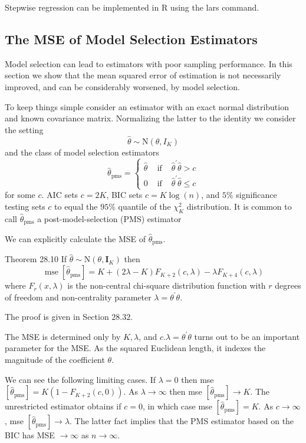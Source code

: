 \documentclass[10pt]{article}
\begin{document}
Stepwise regression can be implemented in R using the lars command.

\subsection{The MSE of Model Selection Estimators}
Model selection can lead to estimators with poor sampling performance. In this section we show that the mean squared error of estimation is not necessarily improved, and can be considerably worsened, by model selection.

To keep things simple consider an estimator with an exact normal distribution and known covariance matrix. Normalizing the latter to the identity we consider the setting
$$
\widehat{\theta} \sim \mathrm{N}\left(\theta, I_{K}\right)
$$
and the class of model selection estimators
$$
\widehat{\theta}_{\mathrm{pms}}=\left\{\begin{array}{lll}
\widehat{\theta} & \text { if } & \widehat{\theta}^{\prime} \widehat{\theta}>c \\
0 & \text { if } & \widehat{\theta}^{\prime} \hat{\theta} \leq c
\end{array}\right.
$$
for some $c$. AIC sets $c=2 K$, BIC sets $c=K \log (n)$, and $5 \%$ significance testing sets $c$ to equal the $95 \%$ quantile of the $\chi_{K}^{2}$ distribution. It is common to call $\widehat{\theta}_{\mathrm{pms}}$ a post-model-selection (PMS) estimator

We can explicitly calculate the MSE of $\widehat{\theta}_{\mathrm{pms}}$.

Theorem 28.10 If $\widehat{\theta} \sim \mathrm{N}\left(\theta, \boldsymbol{I}_{K}\right)$ then
$$
\operatorname{mse}\left[\widehat{\theta}_{\mathrm{pms}}\right]=K+(2 \lambda-K) F_{K+2}(c, \lambda)-\lambda F_{K+4}(c, \lambda)
$$
where $F_{r}(x, \lambda)$ is the non-central chi-square distribution function with $r$ degrees of freedom and non-centrality parameter $\lambda=\theta^{\prime} \theta$.

The proof is given in Section $28.32$.

The MSE is determined only by $K, \lambda$, and $c . \lambda=\theta^{\prime} \theta$ turns out to be an important parameter for the MSE. As the squared Euclidean length, it indexes the magnitude of the coefficient $\theta$.

We can see the following limiting cases. If $\lambda=0$ then mse $\left[\widehat{\theta}_{\mathrm{pms}}\right]=K\left(1-F_{K+2}(c, 0)\right)$. As $\lambda \rightarrow \infty$ then mse $\left[\widehat{\theta}_{\mathrm{pms}}\right] \rightarrow K$. The unrestricted estimator obtains if $c=0$, in which case mse $\left[\widehat{\theta}_{\mathrm{pms}}\right]=K$. As $c \rightarrow \infty$, mse $\left[\widehat{\theta}_{\mathrm{pms}}\right] \rightarrow \lambda$. The latter fact implies that the PMS estimator based on the BIC has MSE $\rightarrow \infty$ as $n \rightarrow \infty$.
\end{document}
